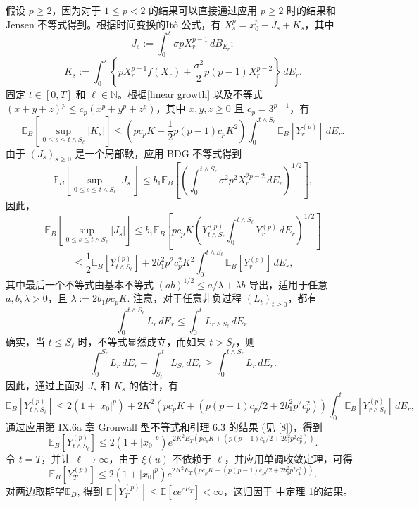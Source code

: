 \documentclass[12pt, final]{article}
\makeatletter
\numberwithin{equation}{section}
\numberwithin{figure}{section}
\numberwithin{table}{section}
\theoremstyle{plain}
\renewcommand{\proofname}{证明}
\theoremstyle{Definition}
\theoremstyle{Remark}
\renewenvironment{proof}[1][\proofname]{\par
	\pushQED{\qed}%
	\normalfont \topsep6\p@\@plus6\p@\relax
	\trivlist\item[\hskip\labelsep
	\bfseries #1\@addpunct{\, :\, }]\ignorespaces
}{%
	\popQED\endtrivlist\@endpefalse
}
\makeatother
\begin{document}
\begin{proof}
	假设 $p \geq 2$，因为对于 $1 \leq p < 2$ 的结果可以直接通过应用 $p \geq 2$ 时的结果和 Jensen 不等式得到。根据时间变换的Itô 公式，有 $X_s^p = x_0^p + J_s + K_s$，其中
	\[
	J_s := \int_0^s \sigma p X_r^{p-1}  \, dB_{E_r};
	\]
	\[
	K_s := \int_0^s \left\{ p X_r^{p-1} f(X_r) + \frac{\sigma^2}{2} p (p-1) X_r^{p-2}  \right\} \, dE_r.
	\]
	固定 $t \in [0, T]$ 和 $\ell \in \mathbb{N}$。根据\cref{linear growth} 以及不等式 $(x + y + z)^p \leq c_p (x^p + y^p + z^p)$，其中 $x, y, z \geq 0$ 且 $c_p = 3^{p-1}$，有
	\[
	\mathbb{E}_B\left[ \sup_{0 \leq s \leq t \wedge S_{\ell}} |K_s| \right] \leq \left( p c_p K + \frac{1}{2} p(p-1) c_p K^2 \right) \int_0^{t \wedge S_{\ell}} \mathbb{E}_B[Y_r^{(p)}] \, dE_r.
	\]
	由于 $(J_s)_{s \geq 0}$ 是一个局部鞅，应用 BDG 不等式得到
	\[
	\mathbb{E}_B\left[\sup_{0 \leq s \leq t \wedge S_{\ell}} |J_s| \right] \leq b_1 \mathbb{E}_B \left[\left( \int_0^{t \wedge S_{\ell}} \sigma^2 p^2 X_r^{2p-2}  \, dE_r \right)^{1/2}\right],
	\]
	因此，
	\[
	\mathbb{E}_B \left[\sup_{0 \leq s \leq t \wedge S_{\ell}} |J_s| \right] \leq b_1 \mathbb{E}_B \left[ p c_p K \left( Y_{t \wedge S_{\ell}}^{(p)} \int_0^{t \wedge S_{\ell}} Y_r^{(p)} \, dE_r \right)^{1/2} \right]
	\]
	\[
	\leq \frac{1}{2} \mathbb{E}_B \left[Y_{t \wedge S_{\ell}}^{(p)}\right] + 2b_1^2 p^2 c_p^2 K^2 \int_0^{t \wedge S_{\ell}} \mathbb{E}_B \left[Y_r^{(p)}\right] \, dE_r,
	\]
	其中最后一个不等式由基本不等式 $(ab)^{1/2} \leq a/\lambda + \lambda b$ 导出，适用于任意 $a, b, \lambda > 0$，且 $\lambda := 2b_1 p c_p K$. 
	注意，对于任意非负过程 $(L_t)_{t \geq 0}$，都有
	\[
	\int_0^{t \wedge S_{\ell}} L_r \, dE_r \leq \int_0^t L_{r \wedge S_{\ell}} \, dE_r.
	\]
	确实，当 $t \leq S_{\ell}$ 时，不等式显然成立，而如果 $t > S_{\ell}$，则
	\[
	\int_0^{S_{\ell}} L_r \, dE_r + \int_{S_{\ell}}^t L_{S_{\ell}} \, dE_r \geq \int_0^{t \wedge S_{\ell}} L_r \, dE_r.
	\]
	因此，通过上面对 $J_s$ 和 $K_s$ 的估计，有
	\[
	\mathbb{E}_B[Y_{t \wedge S_{\ell}}^{(p)}] \leq 2(1 + |x_0|^p) + 2K^2\left(p c_p K + \left(p(p-1) c_p / 2 + 2b_1^2 p^2 c_p^2\right) \right)\int_0^t \mathbb{E}_B[Y_{r \wedge S_{\ell}}^{(p)}] \, dE_r,
	\]
	通过应用第 IX.6a 章 Gronwall 型不等式和引理 6.3 的结果 (见 [8])，得到
	\[
	\mathbb{E}_B[Y_{t \wedge S_{\ell}}^{(p)}] \leq 2(1 + |x_0|^p) e^{2K^2E_T\left(p c_p K + \left(p(p-1) c_p / 2 + 2b_1^2 p^2 c_p^2\right) \right) }.
	\]
	令 $t = T$，并让 $\ell \to \infty$，由于 $\xi(u)$ 不依赖于 $\ell$，并应用单调收敛定理，可得
	\[
	\mathbb{E}_B[Y_T^{(p)}] \leq 2(1 + |x_0|^p) e^{2K^2E_T \left(p c_p K + \left(p(p-1) c_p / 2 + 2b_1^2 p^2 c_p^2\right) \right)}. 
	\]
	对两边取期望$\mathbb{E}_D$, 得到 $\mathbb{E}[Y_T^{(p)}] \leq \mathbb{E}[ce^{cE_T}] < \infty$，这归因于 \cite{jin2019strong}中定理 1的结果。
	
	
	
	\end{proof}
	
\end{document}
